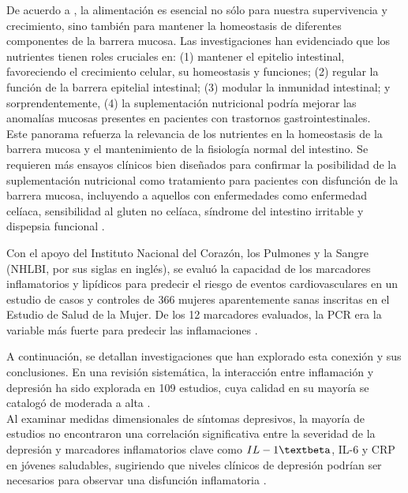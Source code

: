 \documentclass[jou]{apa7}
\begin{document}
	De acuerdo a \parencite{Farre2020}, la alimentación es esencial no sólo
	para nuestra supervivencia y crecimiento, sino también para mantener la
	homeostasis de diferentes componentes de la barrera mucosa. Las
	investigaciones han evidenciado que los nutrientes tienen roles
	cruciales en: (1) mantener el epitelio intestinal, favoreciendo el
	crecimiento celular, su homeostasis y funciones; (2) regular la función
	de la barrera epitelial intestinal; (3) modular la inmunidad intestinal;
	y sorprendentemente, (4) la suplementación nutricional podría mejorar
	las anomalías mucosas presentes en pacientes con trastornos
	gastrointestinales.\\

	Este panorama refuerza la relevancia de los nutrientes en la homeostasis
	de la barrera mucosa y el mantenimiento de la fisiología normal del
	intestino. Se requieren más ensayos clínicos bien diseñados para
	confirmar la posibilidad de la suplementación nutricional como
	tratamiento para pacientes con disfunción de la barrera mucosa,
	incluyendo a aquellos con enfermedades como enfermedad celíaca,
	sensibilidad al gluten no celíaca, síndrome del intestino irritable y
	dispepsia funcional \parencite{Farre2020}.

	Con el apoyo del Instituto Nacional del Corazón, los Pulmones y la
	Sangre (NHLBI, por sus siglas en inglés), se evaluó la capacidad de los
	marcadores inflamatorios y lipídicos para predecir el riesgo de eventos
	cardiovasculares en un estudio de casos y controles de 366 mujeres
	aparentemente sanas inscritas en el Estudio de Salud de la Mujer. De los
	12 marcadores evaluados, la PCR era la variable más fuerte para predecir
	las inflamaciones \parencite{ridkerHighsensitivityCreactiveProtein2004}.

	A continuación, se detallan investigaciones que han explorado esta
	conexión y sus conclusiones. En una revisión sistemática, la interacción
	entre inflamación y depresión ha sido explorada en 109 estudios, cuya
	calidad en su mayoría se catalogó de moderada a alta \parencite{Toenders2022}.\\

	Al examinar medidas dimensionales de síntomas depresivos, la mayoría de
	estudios no encontraron una correlación significativa entre la severidad
	de la depresión y marcadores inflamatorios clave como $IL-1\textbeta$, IL-6 y CRP
	en jóvenes saludables, sugiriendo que niveles clínicos de depresión
	podrían ser necesarios para observar una disfunción inflamatoria
	\parencite{Toenders2022}.\\
\end{document}

